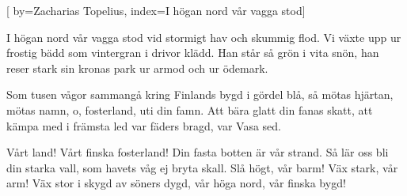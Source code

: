 
[
  by={Zacharias Topelius},
  index={I högan nord vår vagga stod}]
  
\beginverse*
I högan nord vår vagga stod
vid stormigt hav och skummig flod.
Vi växte upp ur frostig bädd
som vintergran i drivor klädd.
Han står så grön i vita snön,
han reser stark sin kronas park
ur armod och ur ödemark.
\endverse

\beginverse*
Som tusen vågor sammangå
kring Finlands bygd i gördel blå,
så mötas hjärtan, mötas namn,
o, fosterland, uti din famn.
Att bära glatt din fanas skatt,
att kämpa med i främsta led
var fäders bragd, var Vasa sed.
\endverse

\beginverse*
Vårt land! Vårt finska fosterland!
Din fasta botten är vår strand.
Så lär oss bli din starka vall,
som havets våg ej bryta skall.
Slå högt, vår barm! Väx stark, vår arm!
Väx stor i skygd av söners dygd,
vår höga nord, vår finska bygd!
\endverse
\endsong